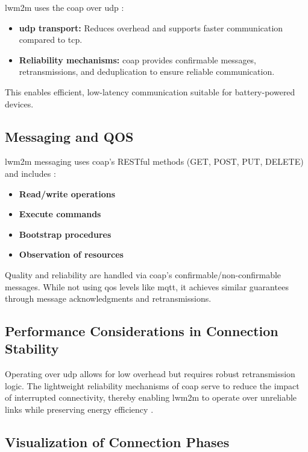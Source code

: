\documentclass[12pt, english, openany]{book}
\begin{document}
\gls{lwm2m} uses the \gls{coap} over \gls{udp} \parencite{oma_lwm2m_2017}:

\begin{itemize}
    \item \textbf{\gls{udp} transport:} Reduces overhead and supports faster communication compared to \gls{tcp}.
    \item \textbf{Reliability mechanisms:} \gls{coap} provides confirmable messages, retransmissions, and deduplication to ensure reliable communication.
\end{itemize}

This enables efficient, low-latency communication suitable for battery-powered devices.

\subsection{Messaging and QOS}

\gls{lwm2m} messaging uses \gls{coap}'s RESTful methods (GET, POST, PUT, DELETE) and includes \parencite{oma_lwm2m_2017}:

\begin{itemize}
    \item \textbf{Read/write operations}
    \item \textbf{Execute commands}
    \item \textbf{Bootstrap procedures}
    \item \textbf{Observation of resources}
\end{itemize}

Quality and reliability are handled via \gls{coap}'s confirmable/non-confirmable messages. While not using \gls{qos} levels like \gls{mqtt}, it achieves similar guarantees through message acknowledgments and retransmissions.

\subsection{Performance Considerations in Connection Stability}

Operating over \gls{udp} allows for low overhead but requires robust retransmission logic. The lightweight reliability mechanisms of \gls{coap} serve to reduce the impact of interrupted connectivity, thereby enabling \gls{lwm2m} to operate over unreliable links while preserving energy efficiency \parencite{oma_lwm2m_2017}.

\subsection{Visualization of Connection Phases}
\end{document}

